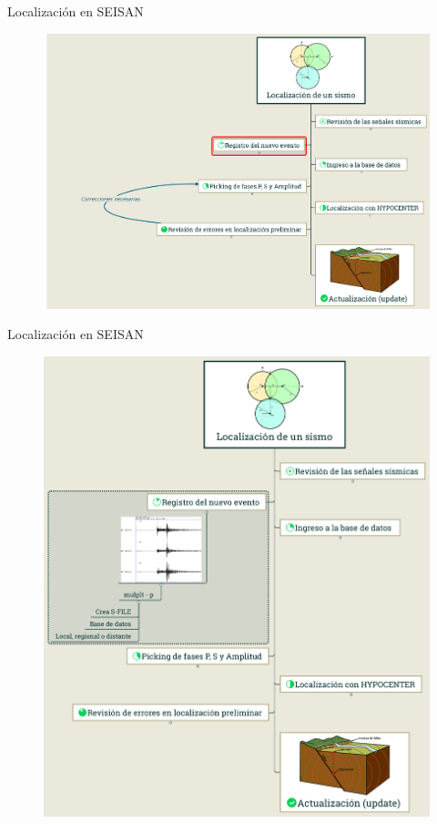 \documentclass[11pt]{beamer}
\begin{document}
\begin{frame}{Localización en SEISAN}
\begin{figure}
\includegraphics[scale=0.15]{localizacion_1_2.png}
\end{figure}
\end{frame}

\begin{frame}{Localización en SEISAN}
\begin{figure}
\includegraphics[scale=0.15]{localizacion_3.png}
\end{figure}
\end{frame}
\end{document}
